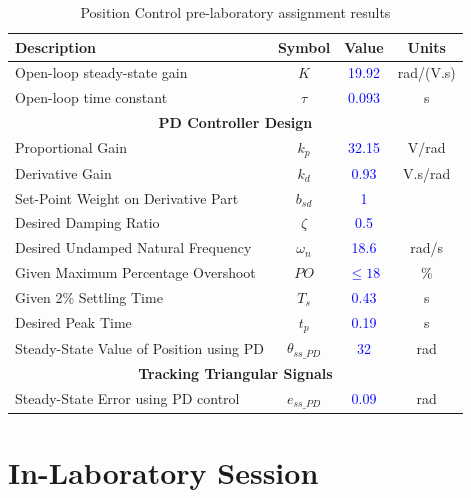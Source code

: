 \documentclass{article}
\begin{document}
\begin{table}[h!]
    \centering
    \begin{tabular}{|l|c|c|c|}
    \hline
    \textbf{Description} & \textbf{Symbol} & \textbf{Value} & \textbf{Units} \\ \hline
    Open-loop steady-state gain & $K$ & \textcolor{blue}{19.92} & rad/(V.s) \\ \hline
    Open-loop time constant & $\tau$ & \textcolor{blue}{0.093} & s \\ \hline
    \multicolumn{4}{|c|}{\textbf{PD Controller Design}} \\ \hline
    Proportional Gain & $k_p$ & \textcolor{blue}{32.15} & V/rad \\ \hline
    Derivative Gain & $k_d$ & \textcolor{blue}{0.93} & V.s/rad \\ \hline
    Set-Point Weight on Derivative Part & $b_{sd}$ & \textcolor{blue}{1} &  \\ \hline
    Desired Damping Ratio & $\zeta$ & \textcolor{blue}{0.5} &  \\ \hline
    Desired Undamped Natural Frequency & $\omega_n$ & \textcolor{blue}{18.6} & rad/s \\ \hline
    Given Maximum Percentage Overshoot & $PO$ & \textcolor{blue}{$\leq 18$} & \% \\ \hline
    Given 2\% Settling Time & $T_s$ & \textcolor{blue}{0.43} & s \\ \hline
    Desired Peak Time & $t_p$ & \textcolor{blue}{0.19} & s \\ \hline
    Steady-State Value of Position using PD & $\theta_{ss\_ PD}$ & \textcolor{blue}{32} & rad \\ \hline
    \multicolumn{4}{|c|}{\textbf{Tracking Triangular Signals}} \\ \hline
    Steady-State Error using PD control & $e_{ss\_ PD}$ & \textcolor{blue}{0.09} & rad \\ \hline
    \end{tabular}
    \caption{Position Control pre-laboratory assignment results}
\end{table}

\section{In-Laboratory Session}
\end{document}

